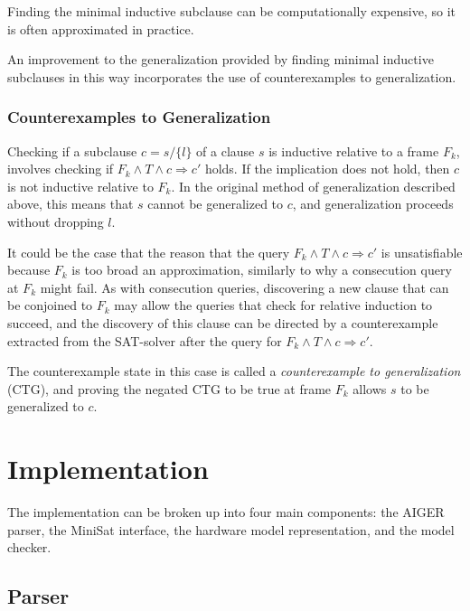 \documentclass[12pt,a4paper,twoside,openright]{report}
\begin{document}
{Finding the minimal inductive subclause can be computationally
expensive, so it is often approximated in practice.

An improvement to the generalization provided by finding minimal
inductive subclauses in this way incorporates the use of counterexamples
to generalization.

\subsection{Counterexamples to Generalization}

Checking if a subclause $c = s / \{l\}$ of a clause $s$ is inductive
relative to a frame $F_k$, involves checking if
$F_k \wedge T \wedge c \Rightarrow c'$ holds.
If the implication does not hold, then $c$ is not inductive relative to
$F_k$. In the original method of generalization described above,
this means that $s$ cannot be generalized to $c$, and generalization
proceeds without dropping $l$.

It could be the case that the reason that the query
$F_k \wedge T \wedge c \Rightarrow c'$ is unsatisfiable because
$F_k$ is too broad an approximation, similarly to why a consecution
query at $F_k$ might fail. As with consecution queries, discovering a
new clause that can be conjoined to $F_k$ may allow the queries that
check for relative induction to succeed, and the discovery of this
clause can be directed by a counterexample extracted from the
SAT-solver after the query for $F_k \wedge T \wedge c \Rightarrow c'$.

The counterexample state in this case is called a \emph{counterexample
to generalization} (CTG), and proving the negated CTG to be true at
frame $F_k$ allows $s$ to be generalized to $c$.


\chapter{Implementation}

The implementation can be broken up into four main components: the AIGER parser, the
MiniSat interface, the hardware model representation, and the model checker.


\section{Parser}

}
\end{document}
